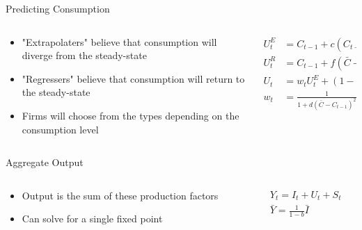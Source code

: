 \documentclass{beamer}
\begin{document}
\begin{frame}{Predicting Consumption}
	\begin{columns}
	\begin{column}{0.5\textwidth}
		\begin{itemize}
			\item "Extrapolaters" believe that consumption will diverge from the steady-state
			\item "Regressers" believe that consumption will return to the steady-state
			\item Firms will choose from the types depending on the consumption level
		\end{itemize}
	\end{column}
	\begin{column}{0.5\textwidth}
		\begin{align*}
			U_t^E &= C_{t-1} + c(C_{t-1}-\bar C)\\
			U_t^R &= C_{t-1} + f(\bar C-C_{t-1})\\
			U_t &= w_tU_t^E+(1-w_t)U_t^R\\
			w_t &= \frac{1}{1+d(\bar C-C_{t-1})^2}
		\end{align*}
	\end{column}
	\end{columns}
\end{frame}

\begin{frame}{Aggregate Output}
	\begin{columns}
	\begin{column}{0.5\textwidth}
		\begin{itemize}
			\item Output is the sum of these production factors
			\item Can solve for a single fixed point
		\end{itemize}
	\end{column}
	\begin{column}{0.5\textwidth}
		\begin{align*}
			Y_t = I_t + U_t + S_t\\ 
			\bar Y = \frac{1}{1-b}\bar I
		\end{align*}
	\end{column}
	\end{columns}
\end{frame}
\end{document}
